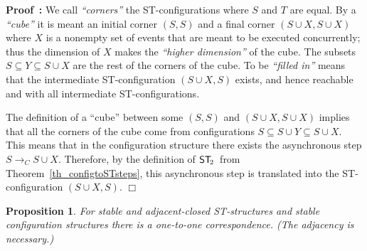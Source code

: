 \documentclass[submission,copyright,creativecommons]{eptcs}
\newtheorem{proposition}[theorem]{Proposition}
\newenvironment{proof}[1][\!\!\,]{\vspace{1ex}\noindent\textbf{Proof #1: }}{\hfill$\Box$\vspace{2ex}}
\newcommand{\cp}[1]{}
\newcommand\stepTransConfGlabbeek{\ensuremath{\rightarrow_{C}}}
\newcommand\cintostSecond{\ensuremath{\mathsf{ST}_{\hspace{-0.4ex}2}}}
\begin{document}
\begin{proof}
We call \textit{``corners''} the ST-configurations where $S$ and $T$ are equal. 
By a \textit{``cube''} it is meant an initial corner $(S,S)$ and a final corner $(S\cup X,S\cup X)$ where $X$ is a nonempty set of events that are meant to be executed concurrently; thus the dimension of $X$ makes the \textit{``higher dimension''} of the cube. The subsets $S\subseteq Y\subseteq S\cup X$ are the rest of the corners of the cube. 
To be \textit{``filled in''} means that the intermediate ST-configuration $(S\cup X,S)$ exists, and hence reachable and with all intermediate ST-configurations.


The definition of a ``cube'' between some $(S,S)$ and $(S\cup X,S\cup X)$ implies that all the corners of the cube come from configurations $S\subseteq S\cup Y\subseteq S\cup X$. This means that in the configuration structure there exists the asynchronous step $S\stepTransConfGlabbeek S\cup X$. Therefore, by the definition of \cintostSecond\ from Theorem~\ref{th_configtoSTsteps}, this asynchronous step is translated into the ST-configuration $(S\cup X,S)$.
\end{proof}

\begin{proposition}\label{prop_stableSTconf}
For stable and adjacent-closed ST-structures and stable configuration structures there is a one-to-one correspondence. (The adjacency is necessary.)
\end{proposition}

\cp{This result could be proven also as a result of equivalence of categories!? Moreover, the proof below makes heavy use of the condition of ST-structures; does the proof go through with the weaker constraint?}
\end{document}
